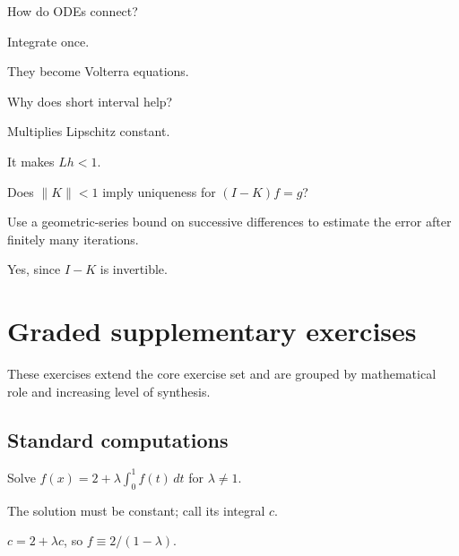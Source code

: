 \begin{exercise}\label{exr:ii18-06}
How do ODEs connect?
\end{exercise}
\begin{hint}
Integrate once.
\end{hint}
\begin{solution}
They become Volterra equations.
\end{solution}

\begin{exercise}\label{exr:ii18-07}
Why does short interval help?
\end{exercise}
\begin{hint}
Multiplies Lipschitz constant.
\end{hint}
\begin{solution}
It makes $Lh<1$.
\end{solution}

\begin{exercise}\label{exr:ii18-08}
Does $\|K\|<1$ imply uniqueness for $(I-K)f=g$?
\end{exercise}
\begin{hint}
Use a geometric-series bound on successive differences to estimate the error after finitely many iterations.
\end{hint}
\begin{solution}
Yes, since $I-K$ is invertible.
\end{solution}


\section{Graded supplementary exercises}
These exercises extend the core exercise set and are grouped by mathematical role and increasing level of synthesis.

\subsection*{Standard computations}

\begin{exercise}\label{exr:ii18-expand-01}
Solve \(f(x)=2+\lambda\int_0^1f(t)\,dt\) for \(\lambda\ne1\).
\end{exercise}
\begin{hint}
The solution must be constant; call its integral \(c\).
\end{hint}
\begin{solution}
\(c=2+\lambda c\), so \(f\equiv2/(1-\lambda)\).
\end{solution}

